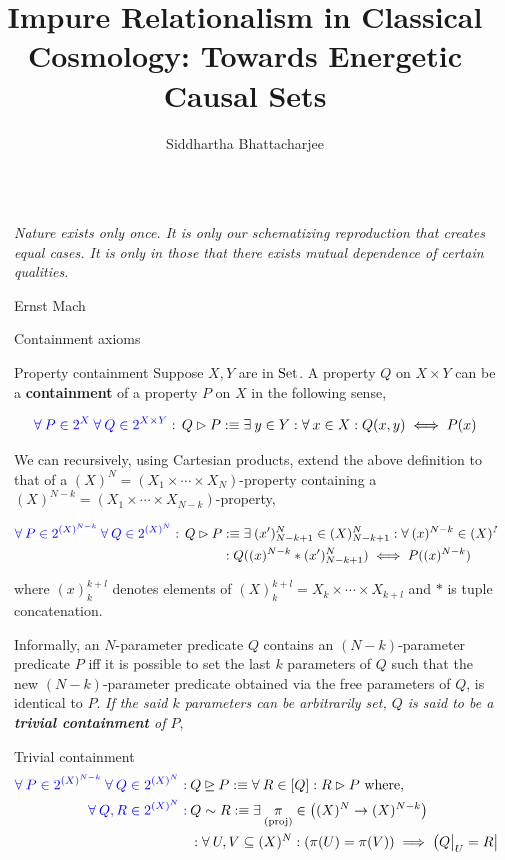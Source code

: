 \documentclass[final]{beamer}
\title{Impure Relationalism in Classical Cosmology: Towards Energetic Causal Sets}
\author{Siddhartha Bhattacharjee}
\institute[shortinst]{University of Waterloo}
\newlength{\sepwidth}
\newlength{\colwidth}
\newcommand{\separatorcolumn}{\begin{column}{\sepwidth}\end{column}}
\newcommand{\fa}{\forall \:}
\theoremstyle{remark}
\begin{document}
\begin{frame}[t]
\begin{columns}[t]
\separatorcolumn

\begin{column}{\colwidth}

\epigraph{\textit{Nature exists only once. It is only our schematizing reproduction that creates equal cases. It is only in those that there exists mutual dependence of certain qualities.}}{Ernst Mach}

\begin{block}{Containment axioms}
\begin{alertblock}{Property containment}
Suppose $X, Y$ are in $\text{Set}$. A property $Q$ on $X \times Y$ can be a \textbf{containment} of a property $P$ on $X$ in the following sense,

$$\qua{\fa P \in 2^X \: \fa Q \in 2^{X \times Y} :} \: Q \rhd P : \equiv \exi y \in Y : \fa x \in X : Q(x, y) \iff P(x)$$

We can recursively, using Cartesian products, extend the above definition to that of a $(X)^N = (X_1 \times \cdots \times X_N)$-property containing a $(X)^{N-k} = (X_1 \times \cdots \times X_{N-k})$-property,

\begin{align*}
\qua{\fa P \in 2^{(X)^{N-k}} \: \fa Q \in 2^{(X)^N} :} \: Q \rhd P & : \equiv \exi (x')_{N-k+1}^{N} \in (X)_{N-k+1}^{N} : \fa (x)^{N-k} \in (X)^{N-k} \\
& : Q((x)^{N-k} * (x')_{N-k+1}^N) \iff P((x)^{N-k})
\end{align*}

where $(x)_k^{k+l}$ denotes elements of $(X)_k^{k+l} = X_k \times \cdots \times X_{k+l}$ and $*$ is tuple concatenation.
\end{alertblock}

Informally, an $N$-parameter predicate $Q$ contains an $(N-k)$-parameter predicate $P$ iff it is possible to set the last $k$ parameters of $Q$ such that the new $(N-k)$-parameter predicate obtained via the free parameters of $Q$, is identical to $P$. \emph{If the said $k$ parameters can be arbitrarily set, $Q$ is said to be a \textbf{trivial containment} of $P$},

\begin{alertblock}{Trivial containment}
\begin{align*}
\qua{\fa P \in 2^{(X)^{N-k}} \: \fa Q \in 2^{(X)^N} :} & Q \unrhd P : \equiv \fa R \in [Q] : R \rhd P \text{ where,} \\
\qua{\fa Q, R \in 2^{(X)^N} :} & Q \sim R : \equiv \exi \underset{\text{(proj)}}{\pi} \in \p{(X)^N \to (X)^{N-k}} \\
& : \fa U, V \subseteq (X)^N : \p{\pi(U) = \pi(V)} \implies \p{Q \big\vert_U = R \big\vert_V}
\end{align*}
\end{alertblock}


\end{block}
\end{column}
\end{columns}
\end{frame}
\end{document}
